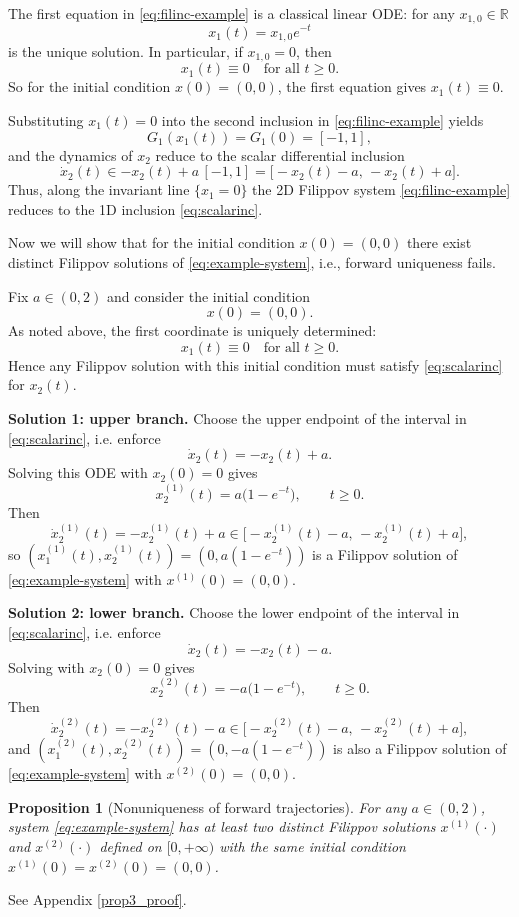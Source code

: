 \documentclass[journal]{IEEEtran}
\theoremstyle{myplain}
\newtheorem{proposition}{Proposition}
\begin{document}
The first equation in \eqref{eq:filinc-example} is a classical linear ODE: for any $x_{1,0}\in\mathbb{R}$
\[
x_{1}(t)=x_{1,0}e^{-t}
\]
is the unique solution. In particular, if $x_{1,0}=0$, then
\[
x_{1}(t)\equiv 0\quad\text{for all }t\geq 0.
\]
So for the initial condition $x(0)=(0,0)$, the first equation gives $x_{1}(t)\equiv 0$. 

Substituting $x_{1}(t)=0$ into the second inclusion in \eqref{eq:filinc-example} yields
\[
G_{1}(x_{1}(t))=G_{1}(0)=[-1,1],
\]
and the dynamics of $x_{2}$ reduce to the scalar differential inclusion
\begin{equation}\label{eq:scalarinc}
\dot{x}_{2}(t)\in -x_{2}(t)+a\,[-1,1]=\bigl[-x_{2}(t)-a,\,-x_{2}(t)+a\bigr].
\end{equation}
Thus, along the invariant line $\{x_{1}=0\}$ the 2D Filippov system \eqref{eq:filinc-example} reduces to the 1D inclusion \eqref{eq:scalarinc}.

Now we will show that for the initial condition $x(0)=(0,0)$ there exist distinct Filippov solutions of \eqref{eq:example-system}, i.e., forward uniqueness fails.

Fix $a\in(0,2)$ and consider the initial condition
\[
x(0)=(0,0).
\]
As noted above, the first coordinate is uniquely determined:
\[
x_{1}(t)\equiv 0\quad\text{for all }t\geq 0.
\]
Hence any Filippov solution with this initial condition must satisfy \eqref{eq:scalarinc} for $x_{2}(t)$.

\medskip
\textbf{Solution 1: upper branch.}
Choose the upper endpoint of the interval in \eqref{eq:scalarinc}, i.e. enforce
\[
\dot{x}_{2}(t)=-x_{2}(t)+a.
\]
Solving this ODE with $x_{2}(0)=0$ gives
\[
x_{2}^{(1)}(t)=a\bigl(1-e^{-t}\bigr),\qquad t\geq 0.
\]
Then
\[
\dot{x}_{2}^{(1)}(t)=-x_{2}^{(1)}(t)+a\in\bigl[-x_{2}^{(1)}(t)-a,\,-x_{2}^{(1)}(t)+a\bigr],
\]
so $(x_{1}^{(1)}(t),x_{2}^{(1)}(t))=(0,a(1-e^{-t}))$ is a Filippov solution of \eqref{eq:example-system} with $x^{(1)}(0)=(0,0)$.

\medskip
\textbf{Solution 2: lower branch.}
Choose the lower endpoint of the interval in \eqref{eq:scalarinc}, i.e. enforce
\[
\dot{x}_{2}(t)=-x_{2}(t)-a.
\]
Solving with $x_{2}(0)=0$ gives
\[
x_{2}^{(2)}(t)=-a\bigl(1-e^{-t}\bigr),\qquad t\geq 0.
\]
Then
\[
\dot{x}_{2}^{(2)}(t)=-x_{2}^{(2)}(t)-a\in\bigl[-x_{2}^{(2)}(t)-a,\,-x_{2}^{(2)}(t)+a\bigr],
\]
and $(x_{1}^{(2)}(t),x_{2}^{(2)}(t))=(0,-a(1-e^{-t}))$ is also a Filippov solution of \eqref{eq:example-system} with $x^{(2)}(0)=(0,0)$.

\begin{proposition}[Nonuniqueness of forward trajectories]
For any $a\in(0,2)$, system \eqref{eq:example-system} has at least two distinct Filippov solutions $x^{(1)}(\cdot)$ and $x^{(2)}(\cdot)$ defined on $[0,+\infty)$ with the same initial condition $x^{(1)}(0)=x^{(2)}(0)=(0,0)$.
\end{proposition}
\begin{IEEEproof}
See Appendix \ref{prop3_proof}.
\end{IEEEproof}
\end{document}
